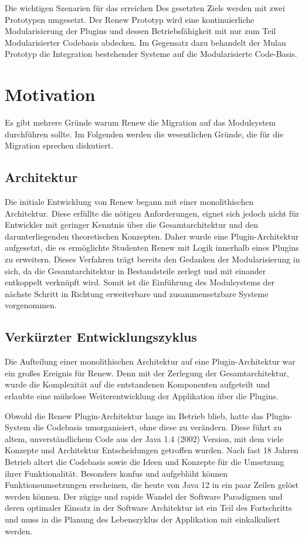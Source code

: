 	Die wichtigen Szenarien für das erreichen Des gesetzten Ziels werden mit zwei Prototypen umgesetzt. Der Renew Prototyp wird eine kontinuierliche  Modularisierung der Plugins und dessen Betriebsfähigkeit mit nur zum Teil Modularisierter Codebasis abdecken. Im Gegensatz dazu behandelt der Mulan Prototyp die Integration bestehender Systeme auf die Modularisierte Code-Basis. 


\section{Motivation}\label{sec:motivation}
	Es gibt mehrere Gründe warum Renew die Migration auf das Modulsystem durchführen sollte. Im Folgenden werden die wesentlichen Gründe, die für die Migration sprechen diskutiert.  

\subsection{Architektur} \label{sub:architektur}
	Die initiale Entwicklung von Renew begann mit einer monolithischen Architektur. Diese erfüllte die nötigen Anforderungen, eignet sich jedoch nicht für Entwickler mit geringer Kenntnis über die Gesamtarchitektur und den darunterliegenden theoretischen Konzepten. Daher wurde eine Plugin-Architektur aufgesetzt, die es ermöglichte Studenten Renew mit Logik innerhalb eines Plugins zu erweitern. Dieses Verfahren trägt bereits den Gedanken der Modularisierung in sich, da die Gesamtarchitektur in Bestandsteile zerlegt und mit einander entkoppelt verknüpft wird. Somit ist die Einführung des Modulsystems der nächste Schritt in Richtung erweiterbare und zusammensetzbare Systeme vorgenommen.

\subsection{Verkürzter Entwicklungszyklus}\label{sub:vez}
	Die Aufteilung einer monolithischen Architektur auf eine Plugin-Architektur war ein großes Ereignis für Renew. Denn mit der Zerlegung der Gesamtarchitektur, wurde die Komplexität auf die entstandenen Komponenten aufgeteilt und erlaubte eine mühelose Weiterentwicklung der Applikation über die Plugins. \bigbreak

	Obwohl die Renew Plugin-Architektur lange im Betrieb blieb, hatte das Plugin-System die Codebasis umorganisiert, ohne diese zu verändern. Diese führt zu altem, unverständlichem Code aus der Java 1.4 (2002) Version, mit dem viele Konzepte und Architektur Entscheidungen getroffen wurden. Nach fast 18 Jahren Betrieb altert die Codebasis sowie die Ideen und Konzepte für die Umsetzung ihrer Funktionalität. Besonders konfus und aufgebläht können Funktionsumsetzungen erscheinen, die heute von Java 12 in ein paar Zeilen gelöst werden können. Der zügige und rapide Wandel der Software Paradigmen und deren optimaler Einsatz in der Software Architektur ist ein Teil des Fortschritts und muss in die Planung des Lebenszyklus der Applikation mit einkalkuliert werden. \newline

